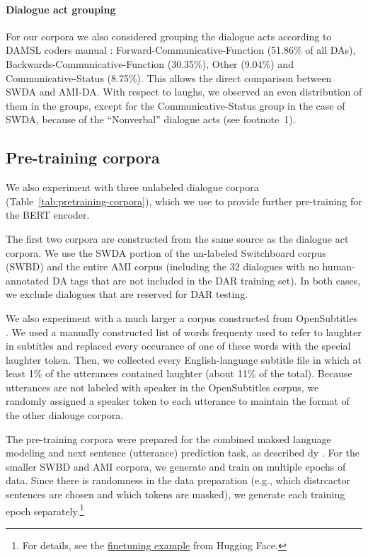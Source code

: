 \documentclass[11pt,a4paper]{article}
\begin{document}
\paragraph{Dialogue act grouping}
For our corpora we also considered grouping the dialogue acts according to DAMSL coders manual \citep{jurafskySwitchboardSWBDDAMSLShallowDiscourseFunction1997a}: Forward-Communicative-Function (51.86\% of all DAs), Backwards-Communicative-Function (30.35\%), Other (9.04\%) and Communicative-Status (8.75\%).
This allows the direct comparison between SWDA and AMI-DA.
With respect to laughs, we observed an even distribution of them in the groups, except for the Communicative-Status group in the case of SWDA, because of the ``Nonverbal'' dialogue acts (see footnote~1).

\subsection{Pre-training corpora}

We also experiment with three unlabeled dialogue corpora (Table~\ref{tab:pretraining-corpora}), which we use to provide further pre-training for the BERT encoder.

The first two corpora are constructed from the same source as the dialogue act corpora.
We use the SWDA portion of the un-labeled Switchboard corpus (SWBD) and the entire AMI corpus (including the 32 dialogues with no human-annotated DA tags that are not included in the DAR training set).
In both cases, we exclude dialogues that are reserved for DAR testing.

We also experiment with a much larger a corpus constructed from OpenSubtitles \citep{Lison2016}.
We used a manually constructed list of words frequenty used to refer to laughter in subtitles and replaced every occurance of one of these words with the special laughter token. 
Then, we collected every English-language subtitle file in which at least 1\% of the utterances contained laughter (about 11\% of the total).
Because utterances are not labeled with speaker in the OpenSubtitles corpus, we randomly assigned a speaker token to each utterance to maintain the format of the other dialouge corpora.

The pre-training corpora were prepared for the combined maksed language modeling and next sentence (utterance) prediction task, as described dy \citet{devlinBERTPretrainingDeep2018}.
For the smaller SWBD and AMI corpora, we generate and train on multiple epochs of data. Since there is randomness in the data preparation (e.g., which distrcactor sentences are chosen and which tokens are masked), we generate each training epoch separately.\footnote{For details, see the \href{https://github.com/huggingface/transformers/tree/1.1.0/examples/lm_finetuning}{finetuning example} from Hugging Face.}
\end{document}
